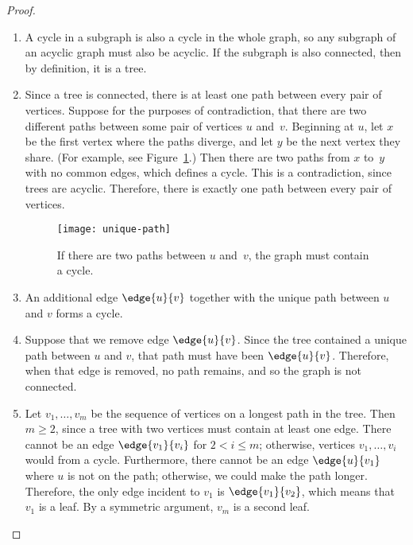 \begin{proof}
\begin{enumerate}

\item A cycle in a subgraph is also a cycle in the whole graph, so any
  subgraph of an acyclic graph must also be acyclic.  If the subgraph
  is also connected, then by definition, it is a tree.

\item Since a tree is connected, there is at least one path between
  every pair of vertices.  Suppose for the purposes of contradiction,
  that there are two different paths between some pair of vertices
  $u$ and~$v$.  Beginning at $u$, let $x$ be the first vertex where
  the paths diverge, and let $y$ be the next vertex they share.  (For
  example, see Figure~\ref{fig:5L}.)  Then there are two paths from
  $x$ to~$y$ with no common edges, which defines a cycle.  This is a
  contradiction, since trees are acyclic.  Therefore, there is
  exactly one path between every pair of vertices.

\begin{figure}\redrawn

\texttt{[image: unique-path]}

\caption{If there are two paths between $u$ and~$v$, the graph must
  contain a cycle.}

\label{fig:5L}
\end{figure}

\item An additional edge $\edge{u}{v}$ together with the unique path
  between $u$ and $v$ forms a cycle.

\item Suppose that we remove edge $\edge{u}{v}$.  Since the tree
  contained a unique path between $u$ and $v$, that path must have
  been $\edge{u}{v}$.  Therefore, when that edge is removed, no path
  remains, and so the graph is not connected.

\item Let $v_1, \dots, v_m$ be the sequence of vertices on a longest
  path in the tree.  Then $m \geq 2$, since a tree with two vertices
  must contain at least one edge.  There cannot be an edge
  $\edge{v_1}{v_i}$ for $2 < i \leq m$; otherwise, vertices $v_1,
  \dots, v_i$ would from a cycle.  Furthermore, there cannot be
  an edge $\edge{u}{v_1}$ where $u$ is not on the path; otherwise, we
  could make the path longer.  Therefore, the only edge incident to
  $v_1$ is $\edge{v_1}{v_2}$, which means that $v_1$ is a leaf.  By a
  symmetric argument, $v_m$ is a second leaf.


\end{enumerate}
\end{proof}
